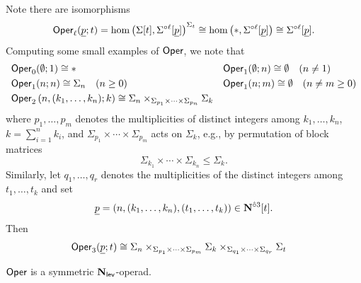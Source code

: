\begin{remark}
    Note there are isomorphisms \begin{equation} \label{eq:oper-iso} \mathsf{Oper}_{\ell} (\underline{p};t)=\hom \left(\Sigma[t], \Sigma^{\circ \ell}[\underline{p}] \right)^{\Sigma_t} \cong \hom \left(*, \Sigma^{\circ \ell} [\underline{p}] \right) \cong \Sigma^{\circ \ell} [\underline{p}].\end{equation}
    Computing some small examples of $\mathsf{Oper}$, we note that 
    \begin{align*} 
    &\mathsf{Oper}_0(\emptyset;1) \cong * && \mathsf{Oper}_1(\emptyset;n) \cong \emptyset \quad (n \neq 1)
    \\
    &\mathsf{Oper}_1(n;n) \cong \Sigma_n \quad (n \geq 0) &&  \mathsf{Oper}_1(n;m)\cong \emptyset \quad (n\neq m \geq 0)
    \\
    &\mathsf{Oper}_2\left(n, (k_1,\dots,k_n);k\right)  \cong \Sigma_n \times_{\Sigma_{p_1}\times \cdots \times \Sigma_{p_n}} \Sigma_{k}  
\end{align*}
where $p_1,\dots,p_m$ denotes the multiplicities of distinct integers among $k_1,\dots,k_n$, $k=\sum_{i=1}^n k_i$, and $\Sigma_{p_1}\times \cdots \times \Sigma_{p_m}$ acts on $\Sigma_k$, e.g.,  by permutation of block matrices \[\Sigma_{k_1} \times \cdots \times \Sigma_{k_n} \leq \Sigma_k.\] Similarly, let $q_1,\dots,q_r$ denotes the multiplicities of the distinct integers among $t_1,\dots,t_k$ and set \[\underline{p} = (n, (k_1,\dots,k_n), (t_1,\dots,t_k)) \in \mathbf{N}^{\hat{\circ}3}[t].\]  Then \begin{align*}
    \Oper_3(\underline{p};t) & \cong  \Sigma_n \times_{\Sigma_{p_1}\times \cdots \times \Sigma_{p_m}} \Sigma_k \times_{\Sigma_{q_1}\times \cdots \times \Sigma_{q_r}} \Sigma_t %
    \end{align*} 
\end{remark}

\begin{proposition} \label{prop:Oper-is-Nl}
    $\mathsf{Oper}$ is a symmetric $\mathbf{N}_{\mathsf{lev}}$-operad.
\end{proposition} 

